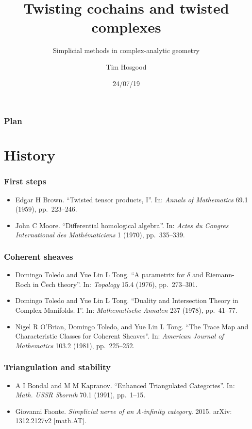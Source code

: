 \documentclass{beamer}
\title{Twisting cochains and twisted complexes}
\subtitle{Simplicial methods in complex-analytic geometry}
\author{Tim Hosgood}
\institute{Université d'Aix-Marseille\\\url{https://thosgood.github.io}\\[1em]\twitter\\\matrix}
\date{24/07/19}
\begin{document}
\begin{frame}
    \titlepage
\end{frame}

\begin{frame}\frametitle{Plan}
    \vspace{1em}
    \tableofcontents
\end{frame}


\section{History}

    \begin{frame}\frametitle{First steps}
        \begin{itemize}
            \item Edgar H Brown. ``Twisted tensor products, I''. In: \emph{Annals of Mathematics} 69.1 (1959), pp.~223--246.
            \item John C Moore. ``Differential homological algebra''. In: \emph{Actes du Congres International des Mathématiciens} 1 (1970), pp.~335--339.
        \end{itemize}
    \end{frame}

    \begin{frame}\frametitle{Coherent sheaves}
        \begin{itemize}
            \item Domingo Toledo and Yue Lin L Tong. ``A parametrix for $\delta$ and Riemann-Roch in Čech theory''. In: \emph{Topology} 15.4 (1976), pp.~273--301.
            \item Domingo Toledo and Yue Lin L Tong. ``Duality and Intersection Theory in Complex Manifolds. I''. In: \emph{Mathematische Annalen} 237 (1978), pp.~41--77.
            \item Nigel R O'Brian, Domingo Toledo, and Yue Lin L Tong. ``The Trace Map and Characteristic Classes for Coherent Sheaves''. In: \emph{American Journal of Mathematics} 103.2 (1981), pp.~225--252.
        \end{itemize}
    \end{frame}

    \begin{frame}\frametitle{Triangulation and stability}
        \begin{itemize}
            \item A I Bondal and M M Kapranov. ``Enhanced Triangulated Categories''. In: \emph{Math. USSR Sbornik} 70.1 (1991), pp.~1--15.
            \item Giovanni Faonte. \emph{Simplicial nerve of an A-infinity category}. 2015. arXiv: 1312.2127v2 [math.AT].
        \end{itemize}
    \end{frame}
\end{document}
